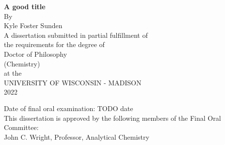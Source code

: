 \documentclass{dissertation}
\begin{document}
\raggedbottom


\begin{centering}
\thispagestyle{empty}


\textbf{A good title} \\
\vspace{80 pt}
By \\
Kyle Foster Sunden \\
\vspace{40 pt}
A dissertation submitted in partial fulfillment of \\
the requirements for the degree of \\
\vspace{10 pt}
Doctor of Philosophy \\ (Chemistry) \\
\vspace{40 pt}
at the \\
UNIVERSITY OF WISCONSIN - MADISON \\
2022 \\
\end{centering}

\vfill

\noindent Date of final oral examination: TODO date \\
This dissertation is approved by the following members of the Final Oral Committee: \\
\-\hspace{1cm} John C. Wright, Professor, Analytical Chemistry \\

\cleardoublepage  %


\renewcommand{\baselinestretch}{0.5}\normalsize
\tableofcontents
\listoffigures
\listoftables
\renewcommand{\baselinestretch}{1}\normalsize

\cleardoublepage


\cleardoublepage

\afterpage{\blankpage}  %

\doublespacing  %
\end{document}

